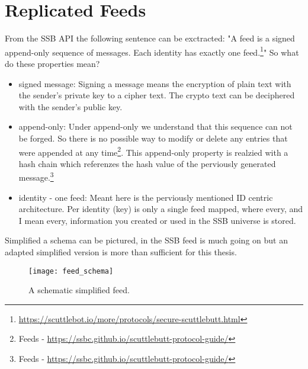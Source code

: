 \section{Replicated Feeds}
From the SSB API the following sentence can be exctracted: "A feed is a signed append-only sequence of messages. Each identity has exactly one feed.\footnote{\url{https://scuttlebot.io/more/protocols/secure-scuttlebutt.html}}"
So what do these properties mean?
\begin{itemize}
    \item signed message: Signing a message means the encryption of plain text with the sender's private key to a cipher text. The crypto text can be deciphered with the sender's public key.
    \item append-only: Under append-only we understand that this sequence can not be forged. So there is no possible way to modify or delete any entries that were appended at any time\footnote{Feeds - \url{https://ssbc.github.io/scuttlebutt-protocol-guide/}}. This append-only property is realzied with a hash chain which referenzes the hash value of the perviously generated message.\footnote{Feeds - \url{https://ssbc.github.io/scuttlebutt-protocol-guide/}}
    \item identity - one feed: Meant here is the perviously mentioned ID centric architecture. Per identity (key) is only a single feed mapped, where every, and I mean every, information you created or used in the SSB universe is stored.
\end{itemize}
Simplified a schema can be pictured, in the SSB feed is much going on but an adapted simplified version is more than sufficient for this thesis.

\begin{figure}
    \centering
    \texttt{[image: feed\_schema]}
    \caption{A schematic simplified feed.}
    \label{fig:feed_schema}
\end{figure}

